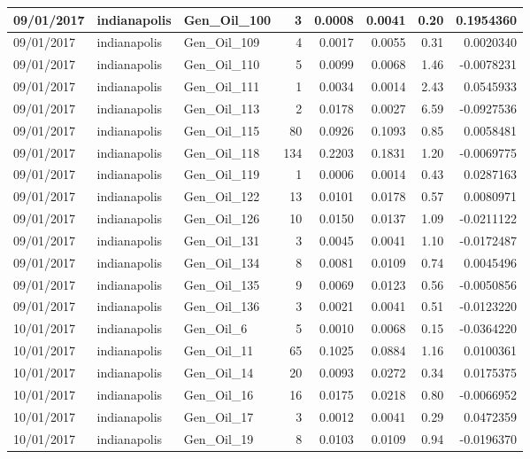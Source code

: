\documentclass[
  letterpaper,
  DIV=11,
  numbers=noendperiod]{scrartcl}
\begin{document}
\begin{tabular}{l|l|l|r|r|r|r|r}
\hline
09/01/2017 & indianapolis & Gen\_Oil\_100 & 3 & 0.0008 & 0.0041 & 0.20 & 0.1954360\\
\hline
09/01/2017 & indianapolis & Gen\_Oil\_109 & 4 & 0.0017 & 0.0055 & 0.31 & 0.0020340\\
\hline
09/01/2017 & indianapolis & Gen\_Oil\_110 & 5 & 0.0099 & 0.0068 & 1.46 & -0.0078231\\
\hline
09/01/2017 & indianapolis & Gen\_Oil\_111 & 1 & 0.0034 & 0.0014 & 2.43 & 0.0545933\\
\hline
09/01/2017 & indianapolis & Gen\_Oil\_113 & 2 & 0.0178 & 0.0027 & 6.59 & -0.0927536\\
\hline
09/01/2017 & indianapolis & Gen\_Oil\_115 & 80 & 0.0926 & 0.1093 & 0.85 & 0.0058481\\
\hline
09/01/2017 & indianapolis & Gen\_Oil\_118 & 134 & 0.2203 & 0.1831 & 1.20 & -0.0069775\\
\hline
09/01/2017 & indianapolis & Gen\_Oil\_119 & 1 & 0.0006 & 0.0014 & 0.43 & 0.0287163\\
\hline
09/01/2017 & indianapolis & Gen\_Oil\_122 & 13 & 0.0101 & 0.0178 & 0.57 & 0.0080971\\
\hline
09/01/2017 & indianapolis & Gen\_Oil\_126 & 10 & 0.0150 & 0.0137 & 1.09 & -0.0211122\\
\hline
09/01/2017 & indianapolis & Gen\_Oil\_131 & 3 & 0.0045 & 0.0041 & 1.10 & -0.0172487\\
\hline
09/01/2017 & indianapolis & Gen\_Oil\_134 & 8 & 0.0081 & 0.0109 & 0.74 & 0.0045496\\
\hline
09/01/2017 & indianapolis & Gen\_Oil\_135 & 9 & 0.0069 & 0.0123 & 0.56 & -0.0050856\\
\hline
09/01/2017 & indianapolis & Gen\_Oil\_136 & 3 & 0.0021 & 0.0041 & 0.51 & -0.0123220\\
\hline
10/01/2017 & indianapolis & Gen\_Oil\_6 & 5 & 0.0010 & 0.0068 & 0.15 & -0.0364220\\
\hline
10/01/2017 & indianapolis & Gen\_Oil\_11 & 65 & 0.1025 & 0.0884 & 1.16 & 0.0100361\\
\hline
10/01/2017 & indianapolis & Gen\_Oil\_14 & 20 & 0.0093 & 0.0272 & 0.34 & 0.0175375\\
\hline
10/01/2017 & indianapolis & Gen\_Oil\_16 & 16 & 0.0175 & 0.0218 & 0.80 & -0.0066952\\
\hline
10/01/2017 & indianapolis & Gen\_Oil\_17 & 3 & 0.0012 & 0.0041 & 0.29 & 0.0472359\\
\hline
10/01/2017 & indianapolis & Gen\_Oil\_19 & 8 & 0.0103 & 0.0109 & 0.94 & -0.0196370\\

\end{tabular}
\end{document}
